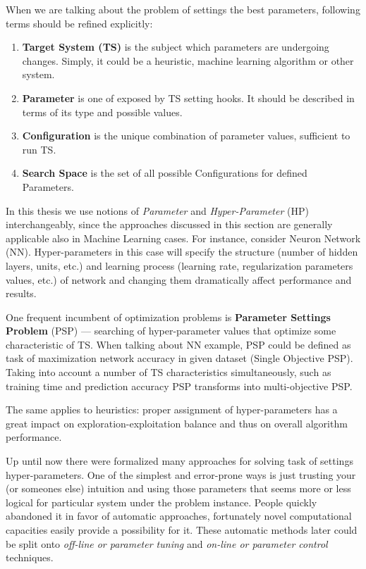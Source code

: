 When we are talking about the problem of settings the best parameters, following terms should be refined explicitly:
\begin{enumerate}
	\item \textbf{Target System (TS)} is the subject which parameters are undergoing changes. Simply, it could be a heuristic, machine learning algorithm or other system.
	\item \textbf{Parameter} is one of exposed by TS setting hooks. It should be described in terms of its type and possible values.
	\item \textbf{Configuration} is the unique combination of parameter values, sufficient to run TS.
	\item \textbf{Search Space} is the set of all possible Configurations for defined Parameters.
\end{enumerate}

In this thesis we use notions of \textit{Parameter} and \textit{Hyper-Parameter} (HP) interchangeably, since the approaches discussed in this section are generally applicable also in Machine Learning cases. For instance, consider Neuron Network (NN). Hyper-parameters in this case will specify the structure (number of hidden layers, units, etc.) and learning process (learning rate, regularization parameters values, etc.) of network and changing them dramatically affect performance and results.

One frequent incumbent of optimization problems is \textbf{Parameter Settings Problem} (PSP) — searching of hyper-parameter values that optimize some characteristic of TS. When talking about NN example, PSP could be defined as task of maximization network accuracy in given dataset (Single Objective PSP). Taking into account a number of TS characteristics simultaneously, such as training time and prediction accuracy PSP transforms into multi-objective PSP.

The same applies to heuristics: proper assignment of hyper-parameters has a great impact on exploration-exploitation balance and thus on overall algorithm performance.

Up until now there were formalized many approaches for solving task of settings hyper-parameters. 
One of the simplest and error-prone ways is just trusting your (or someones else) intuition and using those parameters that seems more or less logical for particular system under the problem instance. People quickly abandoned it in favor of automatic approaches, fortunately novel computational capacities easily provide a possibility for it. These automatic methods later could be split onto \textit{off-line or parameter tuning} and \textit{on-line or parameter control} techniques.

